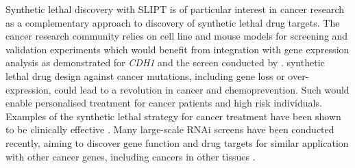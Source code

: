 Synthetic lethal discovery with \gls{SLIPT} is of particular interest in cancer research as a complementary approach to discovery of \gls{synthetic lethal} drug targets. The cancer research community relies on cell line and mouse models for screening and validation experiments \citep{Fece2015} which would benefit from integration with \gls{gene expression} analysis as demonstrated for \textit{CDH1} and the screen conducted by \citet{Telford2015}. \Gls{synthetic lethal} drug design against cancer \glspl{mutation}, including gene loss or over-expression, could lead to a revolution in cancer  and \gls{chemoprevention}. Such  would enable personalised treatment for cancer patients and high risk individuals.  Examples of the \gls{synthetic lethal} strategy \citep{Farmer2005, Bryant2005} for cancer treatment have been shown to be clinically effective \citep{McLachlan2016}. Many large-scale \gls{RNAi} screens have been conducted recently, aiming to discover gene function and drug targets for similar application with other cancer genes, including cancers in other tissues \citep{Fece2015}.



